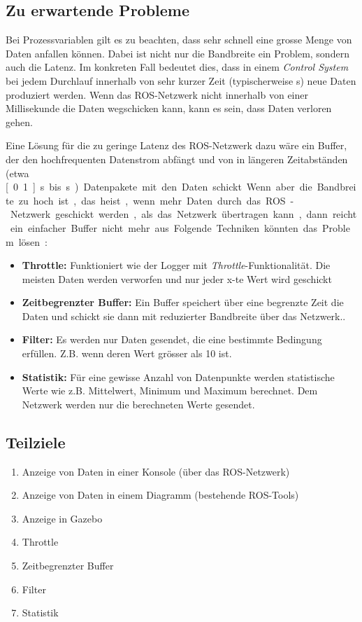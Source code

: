 \subsection{Zu erwartende Probleme}
Bei Prozessvariablen gilt es zu beachten, dass sehr schnell eine grosse Menge von Daten anfallen können.
Dabei ist nicht nur die Bandbreite ein Problem, sondern auch die Latenz.
Im konkreten Fall bedeutet dies, dass in einem \textit{Control System} bei jedem Durchlauf innerhalb von sehr kurzer Zeit (typischerweise \unit[1]{s}) neue Daten produziert werden.
Wenn das ROS-Netzwerk nicht innerhalb von einer Millisekunde die Daten wegschicken kann, kann es sein, dass Daten verloren gehen.

Eine Lösung für die zu geringe Latenz des ROS-Netzwerk dazu wäre ein Buffer, der den hochfrequenten Datenstrom abfängt und von in längeren Zeitabständen (etwa \unit[0.1]{s} bis \unit[1]{s}) Datenpakete mit den Daten schickt.

Wenn aber die Bandbreite zu hoch ist, das heist, wenn mehr Daten durch das ROS-Netzwerk geschickt werden, als das Netzwerk übertragen kann, dann reicht ein einfacher Buffer nicht mehr aus.
Folgende Techniken könnten das Problem lösen:
\begin{itemize}
\item \textbf{Throttle:} Funktioniert wie der Logger mit \textit{Throttle}-Funktionalität. Die meisten Daten werden verworfen und nur jeder x-te Wert wird geschickt
\item \textbf{Zeitbegrenzter Buffer:} Ein Buffer speichert über eine begrenzte Zeit die Daten und schickt sie dann mit reduzierter Bandbreite über das Netzwerk..
\item \textbf{Filter:} Es werden nur Daten gesendet, die eine bestimmte Bedingung erfüllen. Z.B. wenn deren Wert grösser als 10 ist.
\item \textbf{Statistik:} Für eine gewisse Anzahl von Datenpunkte werden statistische Werte wie z.B. Mittelwert, Minimum und Maximum berechnet. Dem Netzwerk werden nur die berechneten Werte gesendet.
\end{itemize}

\subsection{Teilziele}
\begin{enumerate}
\item Anzeige von Daten in einer Konsole (über das ROS-Netzwerk)
\item Anzeige von Daten in einem Diagramm (bestehende ROS-Tools)
\item Anzeige in Gazebo
\item Throttle
\item Zeitbegrenzter Buffer
\item Filter
\item Statistik
\end{enumerate}


